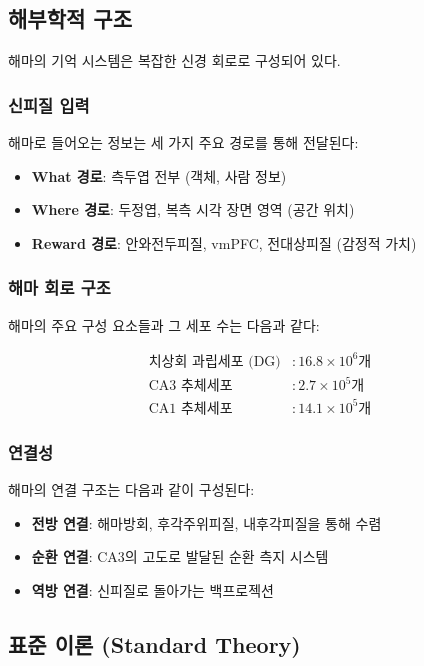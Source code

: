 \documentclass[openany]{book}
\begin{document}
\begin{appendices}
\subsection{해부학적 구조}
해마의 기억 시스템은 복잡한 신경 회로로 구성되어 있다.

\subsubsection{신피질 입력}
해마로 들어오는 정보는 세 가지 주요 경로를 통해 전달된다:

\begin{itemize}
\item \textbf{What 경로}: 측두엽 전부 (객체, 사람 정보)
\item \textbf{Where 경로}: 두정엽, 복측 시각 장면 영역 (공간 위치)
\item \textbf{Reward 경로}: 안와전두피질, vmPFC, 전대상피질 (감정적 가치)
\end{itemize}

\subsubsection{해마 회로 구조}
해마의 주요 구성 요소들과 그 세포 수는 다음과 같다:

\begin{align}
\text{치상회 과립세포 (DG)} &: 16.8 \times 10^6 \text{개} \\
\text{CA3 추체세포} &: 2.7 \times 10^5 \text{개} \\
\text{CA1 추체세포} &: 14.1 \times 10^5 \text{개}
\end{align}

\subsubsection{연결성}
해마의 연결 구조는 다음과 같이 구성된다:

\begin{itemize}
\item \textbf{전방 연결}: 해마방회, 후각주위피질, 내후각피질을 통해 수렴
\item \textbf{순환 연결}: CA3의 고도로 발달된 순환 측지 시스템
\item \textbf{역방 연결}: 신피질로 돌아가는 백프로젝션
\end{itemize}

\subsection{표준 이론 (Standard Theory)}


\end{appendices}
\end{document}
